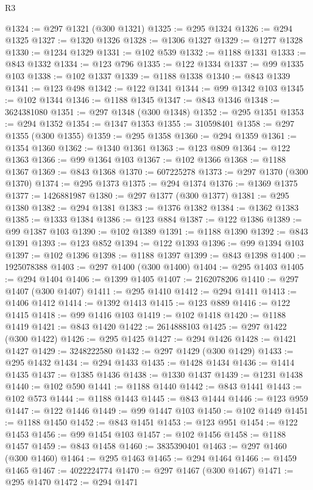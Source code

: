 \begin{lexlean}{R3}
\begin{coremodule}
@1324 := @297 @1321 (@300 @1321)
@1325 := @295 @1324
@1326 := @294 @1325
@1327 := @1320 @1326
@1328 := @1306 @1327
@1329 := @1277 @1328
@1330 := @1234 @1329
@1331 := @102 @539
@1332 := @1188 @1331
@1333 := @843 @1332
@1334 := @123 @796
@1335 := @122 @1334
@1337 := @99 @1335 @103
@1338 := @102 @1337
@1339 := @1188 @1338
@1340 := @843 @1339
@1341 := @123 @498
@1342 := @122 @1341
@1344 := @99 @1342 @103
@1345 := @102 @1344
@1346 := @1188 @1345
@1347 := @843 @1346
@1348 := 3624381080
@1351 := @297 @1348 (@300 @1348)
@1352 := @295 @1351
@1353 := @294 @1352
@1354 := @1347 @1353
@1355 := 310598401
@1358 := @297 @1355 (@300 @1355)
@1359 := @295 @1358
@1360 := @294 @1359
@1361 := @1354 @1360
@1362 := @1340 @1361
@1363 := @123 @809
@1364 := @122 @1363
@1366 := @99 @1364 @103
@1367 := @102 @1366
@1368 := @1188 @1367
@1369 := @843 @1368
@1370 := 607225278
@1373 := @297 @1370 (@300 @1370)
@1374 := @295 @1373
@1375 := @294 @1374
@1376 := @1369 @1375
@1377 := 1426881987
@1380 := @297 @1377 (@300 @1377)
@1381 := @295 @1380
@1382 := @294 @1381
@1383 := @1376 @1382
@1384 := @1362 @1383
@1385 := @1333 @1384
@1386 := @123 @884
@1387 := @122 @1386
@1389 := @99 @1387 @103
@1390 := @102 @1389
@1391 := @1188 @1390
@1392 := @843 @1391
@1393 := @123 @852
@1394 := @122 @1393
@1396 := @99 @1394 @103
@1397 := @102 @1396
@1398 := @1188 @1397
@1399 := @843 @1398
@1400 := 1925078388
@1403 := @297 @1400 (@300 @1400)
@1404 := @295 @1403
@1405 := @294 @1404
@1406 := @1399 @1405
@1407 := 2162078206
@1410 := @297 @1407 (@300 @1407)
@1411 := @295 @1410
@1412 := @294 @1411
@1413 := @1406 @1412
@1414 := @1392 @1413
@1415 := @123 @889
@1416 := @122 @1415
@1418 := @99 @1416 @103
@1419 := @102 @1418
@1420 := @1188 @1419
@1421 := @843 @1420
@1422 := 2614888103
@1425 := @297 @1422 (@300 @1422)
@1426 := @295 @1425
@1427 := @294 @1426
@1428 := @1421 @1427
@1429 := 3248222580
@1432 := @297 @1429 (@300 @1429)
@1433 := @295 @1432
@1434 := @294 @1433
@1435 := @1428 @1434
@1436 := @1414 @1435
@1437 := @1385 @1436
@1438 := @1330 @1437
@1439 := @1231 @1438
@1440 := @102 @590
@1441 := @1188 @1440
@1442 := @843 @1441
@1443 := @102 @573
@1444 := @1188 @1443
@1445 := @843 @1444
@1446 := @123 @959
@1447 := @122 @1446
@1449 := @99 @1447 @103
@1450 := @102 @1449
@1451 := @1188 @1450
@1452 := @843 @1451
@1453 := @123 @951
@1454 := @122 @1453
@1456 := @99 @1454 @103
@1457 := @102 @1456
@1458 := @1188 @1457
@1459 := @843 @1458
@1460 := 3835390401
@1463 := @297 @1460 (@300 @1460)
@1464 := @295 @1463
@1465 := @294 @1464
@1466 := @1459 @1465
@1467 := 4022224774
@1470 := @297 @1467 (@300 @1467)
@1471 := @295 @1470
@1472 := @294 @1471

\end{coremodule}
\end{lexlean}
